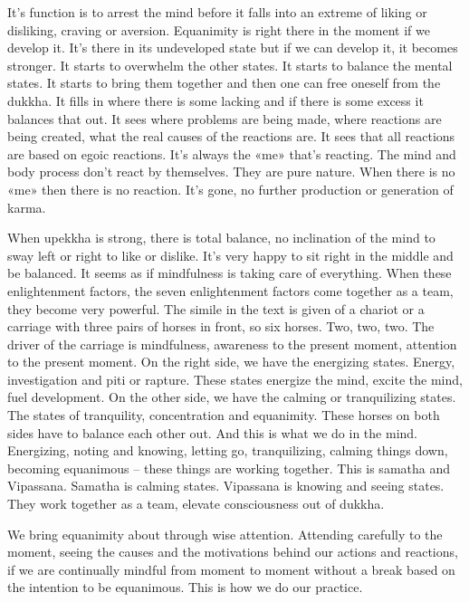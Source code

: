 \documentclass[letterpaper,10pt,english]{sphinxmanual}
\begin{document}
\sphinxAtStartPar
It’s function is to arrest the mind before it falls into an extreme of liking
or disliking, craving or aversion. Equanimity is right there in the moment if
we  develop  it.  It’s  there  in  its  undeveloped  state  but  if  we  can  develop  it,
it becomes stronger. It starts to overwhelm the other states. It starts to balance the mental states. It starts to bring them together and then one can free
oneself from the dukkha. It fills in where there is some lacking and if there
is some excess it balances that out. It sees where problems are being made,
where reactions are being created, what the real causes of the reactions are.
It sees that all reactions are based on egoic reactions. It’s always the «me»
that’s reacting. The mind and body process don’t react by themselves. They
are pure nature. When there is no «me» then there is no reaction. It’s gone,
no further production or generation of karma.

\sphinxAtStartPar
When  upekkha  is  strong,  there  is  total  balance,  no  inclination  of  the
mind to sway left or right to like or dislike. It’s very happy to sit right in the
middle and be balanced. It seems as if mindfulness is taking care of everything.  When  these  enlightenment  factors,  the  seven  enlightenment  factors
  come together as a team, they become very powerful. The simile in the text
is given of a chariot or a carriage with three pairs of horses in front, so six
horses. Two, two, two. The driver of the carriage is mindfulness, awareness
to the present moment, attention to the present moment. On the right side, we
have the energizing states. Energy, investigation and piti or rapture. These
states  energize  the  mind,  excite  the  mind,  fuel  development.  On  the  other
side, we have the calming or tranquilizing states. The states of tranquility,
concentration and equanimity. These horses on both sides have to balance
each other out. And this is what we do in the mind. Energizing, noting and
knowing, letting go, tranquilizing, calming things down, becoming equanimous – these things are working together. This is samatha and Vipassana.
Samatha  is  calming  states.  Vipassana  is  knowing  and  seeing  states.  They
work together as a team, elevate consciousness out of dukkha.

\sphinxAtStartPar
We bring equanimity about through wise attention. Attending carefully
to the moment, seeing the causes and the motivations behind our actions and
reactions,  if  we  are  continually  mindful  from  moment  to  moment  without
a  break  based  on  the  intention  to  be  equanimous.  This  is  how  we  do  our
practice.
\end{document}
